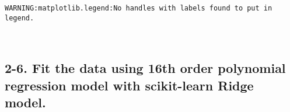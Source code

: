 \documentclass[11pt]{article}
\begin{document}
    \begin{Verbatim}[commandchars=\\\{\}]
WARNING:matplotlib.legend:No handles with labels found to put in legend.

    \end{Verbatim}

    \begin{center}
    \end{center}
    { \hspace*{\fill} \\}
    
    \hypertarget{fit-the-data-using-16th-order-polynomial-regression-model-with-scikit-learn-ridge-model.}{%
\subsection{2-6. Fit the data using 16th order polynomial regression
model with scikit-learn Ridge
model.}\label{fit-the-data-using-16th-order-polynomial-regression-model-with-scikit-learn-ridge-model.}}
\end{document}
